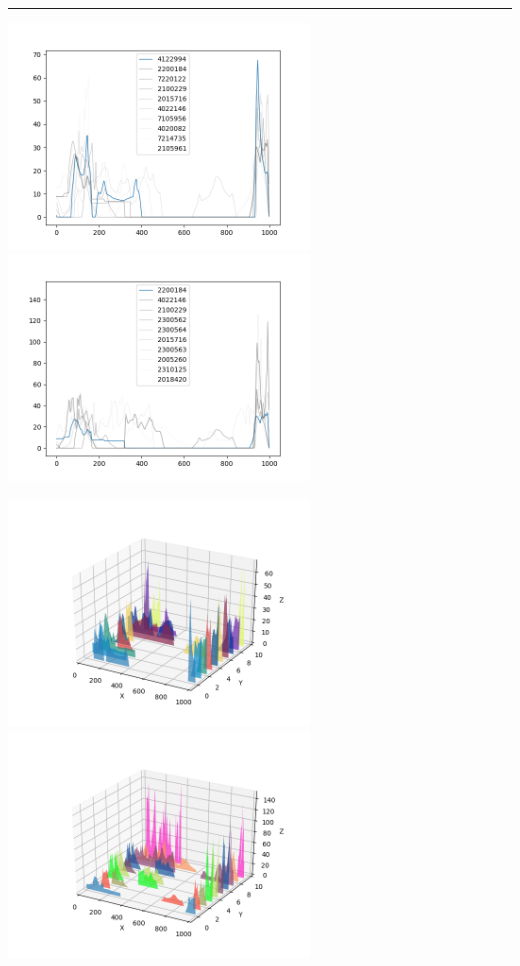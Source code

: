 \documentclass{article}
\begin{document}
\begin{center}
\noindent\rule{\textwidth}{1pt}

\includegraphics[height=6cm, width=8cm]{7.png}\includegraphics[height=6cm, width=8cm]{7_cos.png}

\includegraphics[height=6cm, width=8cm]{7_3d.png} \includegraphics[height=6cm, width=8cm]{7_cos_3d.png}


\end{center}
\end{document}
